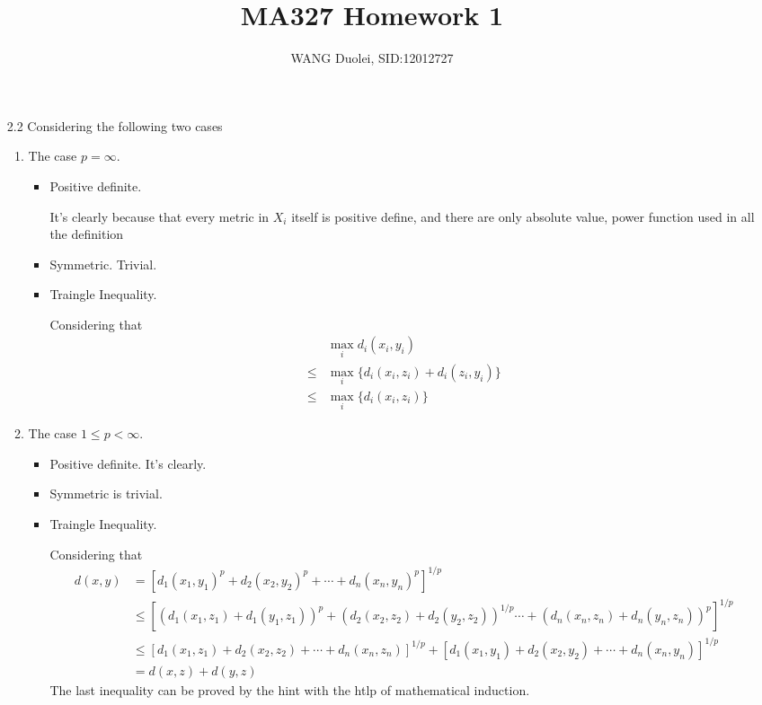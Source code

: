 \documentclass{article}
\title{MA327 Homework 1}
\author{WANG Duolei, SID:12012727}
\affil{wangdl2020@mail.sustech.edu.cn}
\date{}
\begin{document}
\maketitle
\begin{enumerate}
    \item[2.2] 
    Considering the following two cases
    \begin{enumerate}
        \item The case \(p = \infty\).
        
            \begin{itemize}
                \item Positive definite. 
                
                It's clearly because that every metric in \(X_i\) itself is positive define, and there are only absolute value, power function used in all the definition 
    
                \item Symmetric. Trivial.
        
                \item Traingle Inequality.
                
                Considering that
                \begin{align*}
                    &\max_i d_i(x_i, y_i)\\
                    \le &\max_i \{d_i(x_i, z_i) + d_i(z_i, y_i)\}\\
                    \le &\max_i \{d_i(x_i, z_i)\}
                \end{align*}
                
    
            \end{itemize}
    
        \item The case \(1 \le p < \infty\).
        
            \begin{itemize}
                \item Positive definite. It's clearly.
                \item Symmetric is trivial.
                \item Traingle Inequality.
                
                Considering that
                \begin{align*}
                    d(x, y) &= {[{d_1(x_1, y_1)}^p + {d_2(x_2, y_2)}^p + \cdots + {d_n(x_n, y_n)}^p]}^{1/p}\\
                    &\le {[{(d_1(x_1, z_1) + d_1(y_1, z_1))}^p + {(d_2(x_2, z_2) + d_2(y_2, z_2))}^{1/p }\cdots + {(d_n(x_n, z_n) + d_n(y_n, z_n))}^p]}^{1/p}\\
                    &\le {[d_1(x_1, z_1) + d_2(x_2, z_2) + \cdots + d_n(x_n, z_n)]}^{1/p} +{[d_1(x_1, y_1) + d_2(x_2, y_2) + \cdots + d_n(x_n, y_n)]}^{1/p} \\
                    &= d(x, z) + d(y, z)
                \end{align*}
                The last inequality can be proved by the hint with the htlp of mathematical induction.
            \end{itemize}
    


\end{enumerate}
\end{enumerate}
\end{document}
